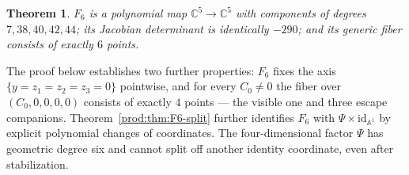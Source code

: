 \documentclass[11pt]{article}
\numberwithin{equation}{section}
\theoremstyle{plain}
\newtheorem{theorem}{Theorem}[section]
\theoremstyle{definition}
\theoremstyle{remark}
\newcommand{\C}{\mathbb{C}}
\newcommand{\A}{\mathbb{A}}
\newcommand{\id}{\mathrm{id}}
\begin{document}
\begin{theorem}\label{thm:F6}
$F_6$ is a polynomial map $\C^5\to\C^5$ with components of degrees
$7,38,40,42,44$; its Jacobian determinant is identically $-290$; and its
generic fiber consists of exactly $6$ points.
\end{theorem}

The proof below establishes two further properties: $F_6$ fixes the axis
$\{y=z_1=z_2=z_3=0\}$ pointwise, and for every $C_0\neq0$ the fiber over
$(C_0,0,0,0,0)$ consists of exactly $4$ points --- the visible one and three
escape companions. Theorem~\ref{prod:thm:F6-split} further identifies $F_6$ with
$\Psi\times\id_{\A^1}$ by explicit polynomial changes of coordinates.
The four-dimensional factor $\Psi$ has geometric degree six and cannot
split off another identity coordinate, even after stabilization.
\end{document}
